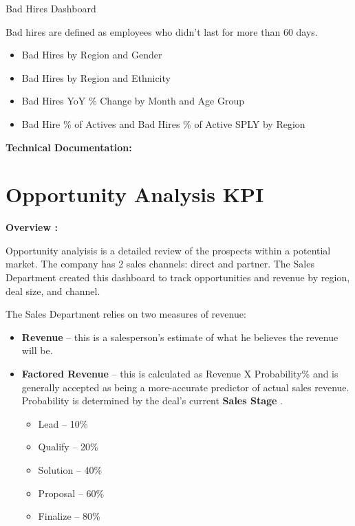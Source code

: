\documentclass[]{book}
\providecommand{\tightlist}{%
  \setlength{\itemsep}{0pt}\setlength{\parskip}{0pt}}
\begin{document}
Bad Hires Dashboard

Bad hires are defined as employees who didn't last for more than 60
days.

\begin{itemize}
\tightlist
\item
  Bad Hires by Region and Gender
\item
  Bad Hires by Region and Ethnicity
\item
  Bad Hires YoY \% Change by Month and Age Group
\item
  Bad Hire \% of Actives and Bad Hires \% of Active SPLY by Region
\end{itemize}

\textbf{Technical Documentation: }

\section{Opportunity Analysis KPI}\label{opportunity-analysis-kpi}

\textbf{Overview :}

Opportunity analyisis is a detailed review of the prospects within a
potential market. The company has 2 sales channels: direct and partner.
The Sales Department created this dashboard to track opportunities and
revenue by region, deal size, and channel.

The Sales Department relies on two measures of revenue:

\begin{itemize}
\tightlist
\item
  \textbf{Revenue }-- this is a salesperson's estimate of what he
  believes the revenue will be.
\item
  \textbf{Factored Revenue } -- this is calculated as Revenue X
  Probability\% and is generally accepted as being a more-accurate
  predictor of actual sales revenue. Probability is determined by the
  deal's current \textbf{Sales Stage }.

  \begin{itemize}
  \tightlist
  \item
    Lead -- 10\%
  \item
    Qualify -- 20\%
  \item
    Solution -- 40\%
  \item
    Proposal -- 60\%
  \item
    Finalize -- 80\%
  \end{itemize}
\end{itemize}
\end{document}
